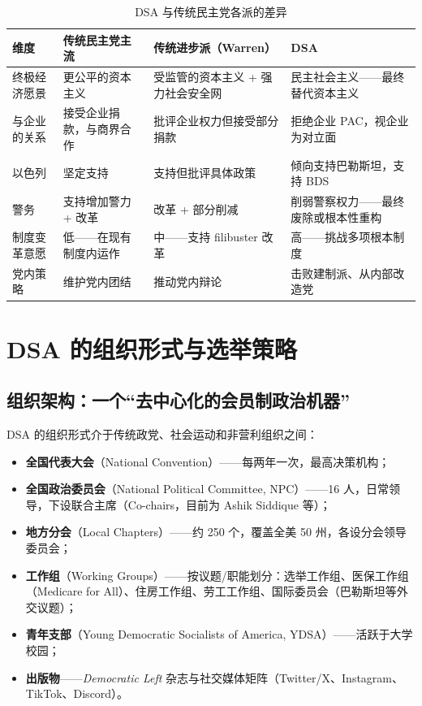 \documentclass[12pt,a4paper]{ctexart}
\begin{document}
\begin{table}[h]
\centering
\caption{DSA 与传统民主党各派的差异}
\begin{tabular}{@{}lp{3.2cm}p{4.2cm}p{5.6cm}@{}}
\toprule
\textbf{维度} & \textbf{传统民主党主流} & \textbf{传统进步派（Warren）} & \textbf{DSA} \\
\midrule
终极经济愿景 & 更公平的资本主义 & 受监管的资本主义 + 强力社会安全网 & 民主社会主义——最终替代资本主义 \\
与企业的关系 & 接受企业捐款，与商界合作 & 批评企业权力但接受部分捐款 & 拒绝企业 PAC，视企业为对立面 \\
以色列 & 坚定支持 & 支持但批评具体政策 & 倾向支持巴勒斯坦，支持 BDS \\
警务 & 支持增加警力 + 改革 & 改革 + 部分削减 & 削弱警察权力——最终废除或根本性重构 \\
制度变革意愿 & 低——在现有制度内运作 & 中——支持 filibuster 改革 & 高——挑战多项根本制度 \\
党内策略 & 维护党内团结 & 推动党内辩论 & 击败建制派、从内部改造党 \\
\bottomrule
\end{tabular}
\end{table}

\section{DSA 的组织形式与选举策略}

\subsection{组织架构：一个``去中心化的会员制政治机器''}

DSA 的组织形式介于传统政党、社会运动和非营利组织之间：

\begin{itemize}
  \item \textbf{全国代表大会}（National Convention）——每两年一次，最高决策机构；
  \item \textbf{全国政治委员会}（National Political Committee, NPC）——16 人，日常领导，下设联合主席（Co-chairs，目前为 Ashik Siddique 等）；
  \item \textbf{地方分会}（Local Chapters）——约 250 个，覆盖全美 50 州，各设分会领导委员会；
  \item \textbf{工作组}（Working Groups）——按议题/职能划分：选举工作组、医保工作组（Medicare for All）、住房工作组、劳工工作组、国际委员会（巴勒斯坦等外交议题）；
  \item \textbf{青年支部}（Young Democratic Socialists of America, YDSA）——活跃于大学校园；
  \item \textbf{出版物}——\emph{Democratic Left} 杂志与社交媒体矩阵（Twitter/X、Instagram、TikTok、Discord）。
\end{itemize}
\end{document}
